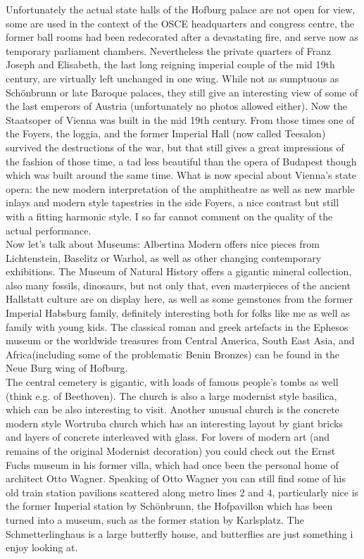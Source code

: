 Unfortunately the actual state halls of the Hofburg palace are not open for view, some are used in the context of the OSCE headquarters and congress centre, the former ball rooms had been redecorated after a devastating fire, and serve now as temporary parliament chambers. Nevertheless the private quarters of Franz Joseph and Elisabeth, the last long reigning imperial couple of the mid 19th century, are virtually left unchanged in one wing. While not as sumptuous as Sch\"onbrunn or late Baroque palaces, they still give an interesting view of some of the last emperors of Austria (unfortunately no photos allowed either). Now the Staatsoper of Vienna was built in the mid 19th century. From those times one of the Foyers, the loggia, and the former Imperial Hall (now called Teesalon) survived the destructions of the war, but that still gives a great impressions of the fashion of those time, a tad less beautiful than the opera of Budapest though which was built around the same time. What is now special about Vienna's state opera: the new modern interpretation of the amphitheatre as well as new marble inlays and modern style tapestries in the side Foyers, a nice contrast but still with a fitting harmonic style. I so far cannot comment on the quality of the actual performance.\\
Now let's talk about Museums: Albertina Modern offers nice pieces from Lichtenstein, Baselitz or Warhol, as well as other  changing contemporary exhibitions. The Museum of Natural History offers a gigantic mineral collection, also many fossils, dinosaurs, but not only that, even masterpieces of the ancient Hallstatt culture are on display here, as well as some gemstones from the former Imperial Habsburg family, definitely interesting both for folks like me as well as family with young kids. The classical roman and greek artefacts in the Ephesos museum or the worldwide treasures from Central America, South East Asia, and Africa(including some of the problematic Benin Bronzes) can be found in the Neue Burg wing of Hofburg. \\
The central cemetery is gigantic, with loads of famous people's tombs as well (think e.g. of Beethoven). The church is also a large modernist style basilica, which can be also interesting to visit. Another unusual church is the concrete modern style Wortruba church which has an interesting layout by giant bricks and layers of concrete interleaved with glass. For lovers of modern art (and remains of the original Modernist decoration) you could check out the Ernst Fuchs museum in his former villa, which had once been the personal home of architect Otto Wagner. Speaking of Otto Wagner you can still find some of his old train station pavilions scattered along metro lines 2 and 4, particularly nice is the former Imperial station by Sch\"onbrunn, the Hofpavillon which has been turned into a museum, such as the former station by Karlsplatz. The Schmetterlinghaus is a large butterfly house, and butterflies are just something i enjoy looking at.\\
